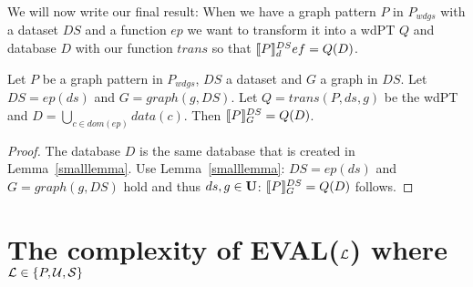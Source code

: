 We will now write our final result: When we have a graph pattern $P$ in
$P_{wdgs}$ with a dataset $DS$ and a function $ep$ we want to transform it into a
wdPT $Q$ and database $D$ with our function $trans$ so that
$\llbracket P \rrbracket^{DS}_def = Q(D)$.
\begin{theorem}\label{biglemma}
    Let $P$ be a graph pattern in $P_{wdgs}$, $DS$ a dataset and $G$ a graph in $DS$.
    Let $DS = ep(ds)$  and $G = graph(g,DS)$. Let $Q = trans(P,ds,g)$ be the
    wdPT and $D = \bigcup\limits_{c \in dom(ep)} data(c)$. Then $\llbracket P \rrbracket^{DS}_G = Q(D)$.
\end{theorem}
\begin{proof}
	The database $D$ is the same database that is created in
	Lemma~\ref{smalllemma}.
	Use Lemma~\ref{smalllemma}: 
	$DS = ep(ds)$  and $G = graph(g,DS)$ hold and thus $ds,g \in \mathbf{U}$:
	$\llbracket P \rrbracket^{DS}_G = Q(D)$ follows.
\end{proof}


\section{The complexity of EVAL($\mathcal{L}$) where $\mathcal{L} \in \{P,\mathcal{U},\mathcal{S}\}$ }


